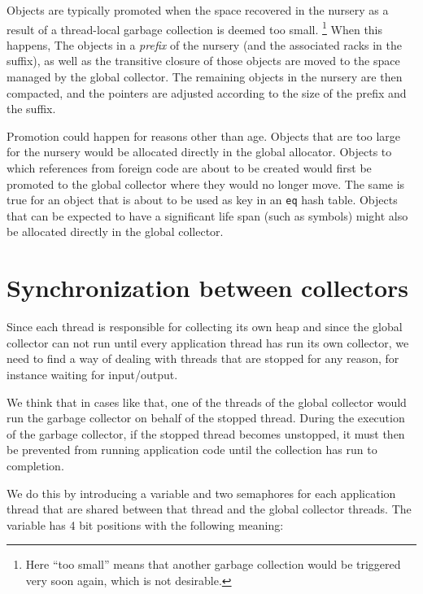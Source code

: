 Objects are typically promoted when the space recovered in the nursery
as a result of a thread-local garbage collection is deemed too small.%
\footnote{Here ``too small'' means that another garbage collection
  would be triggered very soon again, which is not desirable.}  When
this happens, The objects in a \emph{prefix} of the nursery (and the
associated racks in the suffix), as well as the transitive closure of
those objects are moved to the space managed by the global collector.
The remaining objects in the nursery are then compacted, and the
pointers are adjusted according to the size of the prefix and the
suffix.

Promotion could happen for reasons other than age.  Objects that are
too large for the nursery would be allocated directly in the global
allocator.  Objects to which references from foreign code are
about to be created would first be promoted to the global collector
where they would no longer move.  The same is true for an object that
is about to be used as key in an \texttt{eq} hash table.  Objects that
can be expected to have a significant life span (such as symbols)
might also be allocated directly in the global collector. 

\section{Synchronization between collectors}

Since each thread is responsible for collecting its own heap and since
the global collector can not run until every application thread has
run its own collector, we need to find a way of dealing with threads
that are stopped for any reason, for instance waiting for
input/output.

We think that in cases like that, one of the threads of the global
collector would run the garbage collector on behalf of the stopped
thread.  During the execution of the garbage collector, if the stopped
thread becomes unstopped, it must then be prevented from running
application code until the collection has run to completion.

We do this by introducing a variable and two semaphores for each
application thread that are shared between that thread and the global
collector threads.  The variable has 4 bit positions with the
following meaning:

